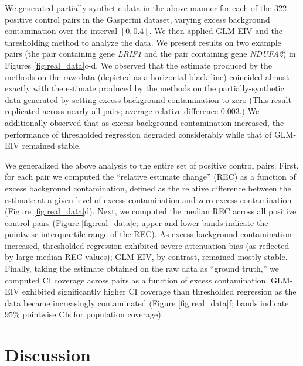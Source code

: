 \documentclass[12pt]{article}
\begin{document}
We generated partially-synthetic data in the above manner for each of the 322 positive control pairs in the Gasperini dataset, varying excess background contamination over the interval $[0,0.4].$ We then applied GLM-EIV and the thresholding method to analyze the data. We present results on two example pairs (the pair containing gene \textit{LRIF1} and the pair containing gene \textit{NDUFA2}) in Figures \ref{fig:real_data}c-d. We observed that the estimate produced by the methods on the raw data (depicted as a horizontal black line) coincided almost exactly with the estimate produced by the methods on the partially-synthetic data generated by setting excess background contamination to zero (This result replicated across nearly all pairs; average relative difference $0.003$.) We additionally observed that as excess background contamination increased, the performance of thresholded regression degraded considerably while that of GLM-EIV remained stable.

We generalized the above analysis to the entire set of positive control pairs. First, for each pair we computed the ``relative estimate change'' (REC) as a function of excess background contamination, defined as the relative difference between the estimate at a given level of excess contamination and zero excess contamination (Figure \ref{fig:real_data}d). Next, we computed the median REC across all positive control pairs (Figure \ref{fig:real_data}e; upper and lower bands indicate the pointwise interquartile range of the REC). As excess background contamination increased, thresholded regression exhibited severe attenuation bias (as reflected by large median REC values); GLM-EIV, by contrast, remained mostly stable. Finally, taking the estimate obtained on the raw data as ``ground truth,'' we computed CI coverage across pairs as a function of excess contamination. GLM-EIV exhibited significantly higher CI coverage than thresholded regression as the data became increasingly contaminated (Figure \ref{fig:real_data}f; bands indicate $95\%$ pointwise CIs for population coverage). 

\section{Discussion}
\end{document}
